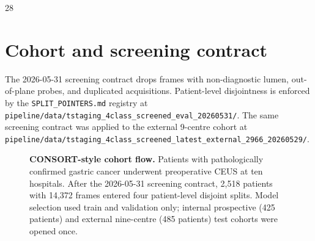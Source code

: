 \documentclass[11pt,a4paper]{article}
\begin{document}
\begin{thebibliography}{28}
\end{thebibliography}

\appendix

\section{Cohort and screening contract}
\label{app:cohort}
The 2026-05-31 screening contract drops frames with non-diagnostic lumen, out-of-plane probes, and duplicated acquisitions. Patient-level disjointness is enforced by the \texttt{SPLIT\_POINTERS.md} registry at \texttt{pipeline/data/tstaging\_4class\_screened\_eval\_20260531/}. The same screening contract was applied to the external 9-centre cohort at \texttt{pipeline/data/tstaging\_4class\_screened\_latest\_external\_2966\_20260529/}.

\begin{figure}[h]
\centering
\small
{}
\caption{\textbf{CONSORT-style cohort flow.} Patients with pathologically confirmed gastric cancer underwent preoperative CEUS at ten hospitals. After the 2026-05-31 screening contract, 2{,}518 patients with 14{,}372 frames entered four patient-level disjoint splits. Model selection used train and validation only; internal prospective (425 patients) and external nine-centre (485 patients) test cohorts were opened once.}
\label{fig:cohortflow}
\end{figure}
\end{document}
